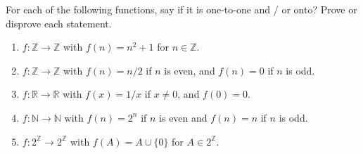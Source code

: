\documentclass{article}
\newcommand{\Z}{\mathbb{Z}}
\newcommand{\N}{\mathbb{N}}
\newcommand{\R}{\mathbb{R}}
\theoremstyle{definition}
\begin{document}
\begin{question}{10}
    For each of the following functions, say if it is one-to-one and / or onto? Prove or disprove each statement.
    \begin{enumerate}
	\item \(f \colon  \Z \to \Z\) with \(f(n) = n^2 + 1\) for \(n \in \Z\).
	\item \(f \colon  \Z \to \Z\) with \(f(n) = n/2\) if \(n\) is even, and \(f(n) = 0\) if \(n\) is odd.
	\item \(f \colon  \R \to \R\) with \(f(x) = 1/x\) if \(x \neq 0\), and \(f(0) = 0\).
	\item \(f\colon \N \to \N\) with \(f(n) = 2^n\) if \(n\) is even and \(f(n) = n\) if \(n\) is odd.
	\item \(f \colon  2^{\Z} \to 2^{\Z}\) with \(f(A) = A \cup \{ 0 \}\) for \(A \in 2^{\Z}\).
    \end{enumerate}
\end{question}
\end{document}

